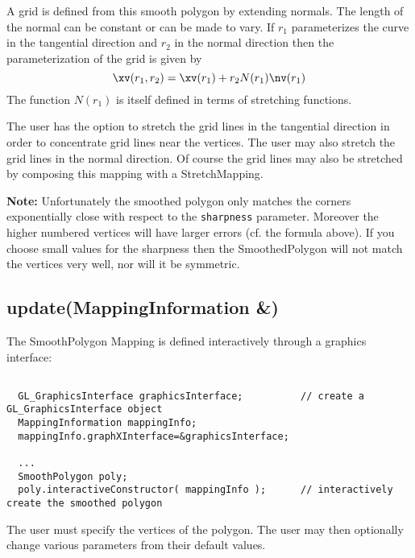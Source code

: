 A grid is defined from this smooth polygon by extending normals. The length
of the normal can be constant or can be made to vary.
If $r_1$ parameterizes the curve in the tangential direction and $r_2$ in the
normal direction then the parameterization of the grid is given by
$$
\xv(r_1,r_2) = \xv(r_1) + r_2 N(r_1) \nv(r_1)
$$
The function $N(r_1)$ is itself defined in terms of stretching functions.

The user has the option to stretch the grid lines in the tangential
direction in order to concentrate grid lines near the vertices. 
The user may also stretch the grid lines in the normal direction.
Of course the grid lines may also be stretched by composing this
mapping with a StretchMapping. 

{\bf Note:}  Unfortunately the smoothed polygon only
matches the corners exponentially close with respect to the {\tt sharpness} parameter.
Moreover the higher numbered vertices will  have larger
errors (cf. the formula above). 
If you choose small values for the sharpness then the SmoothedPolygon
will not match the vertices very well, nor will it be symmetric.


\subsection{update(MappingInformation \&)}

The SmoothPolygon Mapping is defined interactively through a graphics
interface:
{\footnotesize
\begin{verbatim}

  GL_GraphicsInterface graphicsInterface;          // create a GL_GraphicsInterface object
  MappingInformation mappingInfo;
  mappingInfo.graphXInterface=&graphicsInterface;

  ...
  SmoothPolygon poly;
  poly.interactiveConstructor( mappingInfo );      // interactively create the smoothed polygon

\end{verbatim}
}
The user must specify the vertices of the polygon. The user may then
optionally change various parameters from their default values.

